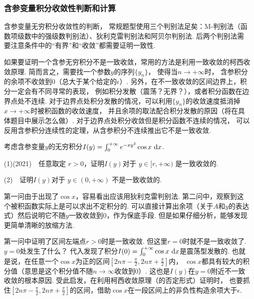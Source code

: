 \subsubsection{含参变量积分收敛性判断和计算}

含参变量无穷积分收敛性的判断，
常规题型使用三个判别法足矣：M-判别法（函数项级数中的强级数判别法）、狄利克雷判别法和阿贝尔判别法.
后两个判别法需要注意条件中的“有界”和“收敛”都需要证明一致性.

如果要证明一个含参无穷积分不是一致收敛，常用的方法是利用一致收敛的柯西收敛原理.
简而言之，需要找一个参数$y$的序列$\{ y_n \}$，
使得当$n \to +\infty$时，
含参积分的余项不收敛到$0$（总大于某个给定的$\epsilon$）.
另外，在不一致收敛的区间边界上，积分一定会有不同寻常的表现，
例如积分发散（震荡？无界？），或者积分函数在边界点处不连续.
对于边界点处积分发散的情况，可以利用$\{ y_n \}$的收敛速度抵消掉$x \to +\infty$时被积函数的收敛速度，
并且余项的取法配合积分发散的原因（将在具体题目中展示怎么做）.
对于边界点处积分收敛但是积分函数不连续的情况，
可以反用含参积分连续性的定理，从含参积分不连续推出它不是一致收敛.

\begin{example}
\label{ex:ch11-14}
考虑含参变量$y$的无穷积分$I(y) = \int_{0}^{+\infty} e^{-xy^2}  \cos x ~\mathrm{d} x$.

(1)(2021)~~任意取定 \( r > 0 \)，证明$I(y)$对于 \( y \in [r, +\infty) \) 是一致收敛的.

(2)~~证明$I(y)$对于 \( y \in (0, +\infty) \) 不是一致收敛的.
\end{example}

\begin{analysis}
第一问由于出现了$\cos x$，容易看出应该用狄利克雷判别法.
    第二问中，观察到这个被积函数实际上是可以求出不定积分的.
    可以直接计算出余项（关于$A$和$y$的表达式）然后说明它不随$y$一致收敛到$0$，作为保底手段.
    但是如果仔细分析，能够发现更简单清晰的放缩方法.

    第一问中证明了区间左端点$r >0$时是一致收敛.
    但这里$r=0$时就不是一致收敛了.
    $y=0$处发生了什么？
    代入发现了积分$I(0) = \int_{0}^{+\infty} \cos x ~\mathrm{d} x$是震荡型发散的.
    也就是说，在任意一个$\cos x$为正的区间$\left[ 2n\pi - \frac{\pi}{2}, 2n\pi + \frac{\pi}{2}\right]$内，
    $\cos x$都具有较大的积分值（意思是这个积分值不随$n \to \infty$收敛到$0$）.
    这也是$I(y)$在$y=0$附近不一致收敛的根本原因.
    受此启发，在利用柯西收敛原理（的否定形式）证明时，
    也要抓住$\left[2n\pi - \frac{\pi}{2}, 2n\pi + \frac{\pi}{2}\right]$的区间，借助$\cos x$在一段区间上的非负性构造余项大于$\epsilon$.
\end{analysis}

